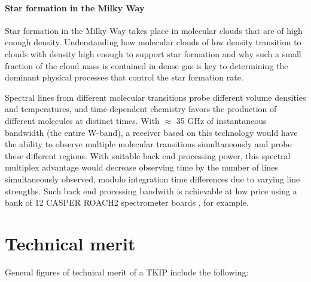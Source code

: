 \paragraph*{Star formation in the Milky Way}
Star formation in the Milky Way takes place in molecular clouds that are of high enough density. Understanding how molecular clouds of low density transition to clouds with density high enough to support star formation and why such a small fraction of the cloud mass is contained in dense gas is key to determining the dominant physical processes that control the star formation rate. 

Spectral lines from different molecular transitions probe different volume densities and temperatures, and time-dependent chemistry favors the production of different molecules at distinct times. With $\approx$ 35 GHz of instantaneous bandwidth (the entire W-band), a receiver based on this technology would have the ability to observe multiple molecular transitions simultaneously and probe these different regions. With suitable back end processing power, this spectral multiplex advantage would decrease observing time by the number of lines simultaneously observed, modulo integration time differences due to varying line strengths. Such back end processing bandwith is achievable at low price using a bank of 12 CASPER ROACH2 spectrometer boards \cite{ROACHweb}, for example. 


%
%
 
\section{Technical merit}
General figures of technical merit of a TKIP include the following:

